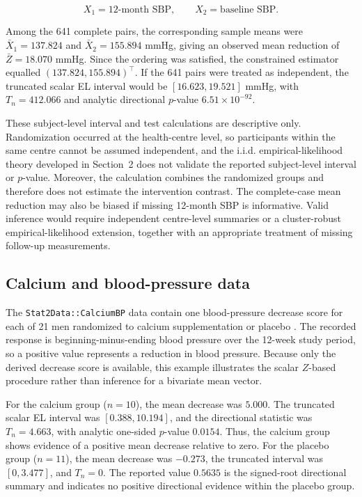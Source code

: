 \documentclass[11pt]{article}
\theoremstyle{remark}
\begin{document}
$$
X_1=\text{12-month SBP},
\qquad
X_2=\text{baseline SBP}.
$$

Among the 641 complete pairs, the corresponding sample means were $\bar X_1=137.824$ and $\bar X_2=155.894$ mmHg, giving an observed mean reduction of $\bar Z=18.070$ mmHg. Since the ordering was satisfied, the constrained estimator equalled $(137.824,155.894)^\top$. If the 641 pairs were treated as independent, the truncated scalar EL interval would be $[16.623,19.521]$ mmHg, with $T_n=412.066$ and analytic directional $p$-value $6.51\times10^{-92}$.

These subject-level interval and test calculations are descriptive only. Randomization occurred at the health-centre level, so participants within the same centre cannot be assumed independent, and the i.i.d. empirical-likelihood theory developed in Section~2 does not validate the reported subject-level interval or $p$-value. Moreover, the calculation combines the randomized groups and therefore does not estimate the intervention contrast. The complete-case mean reduction may also be biased if missing 12-month SBP is informative. Valid inference would require independent centre-level summaries or a cluster-robust empirical-likelihood extension, together with an appropriate treatment of missing follow-up measurements.

\subsection{Calcium and blood-pressure data}

The \texttt{Stat2Data::CalciumBP} data contain one blood-pressure decrease score for each of 21 men randomized to calcium supplementation or placebo \citet{lyle1987blood}. The recorded response is beginning-minus-ending blood pressure over the 12-week study period, so a positive value represents a reduction in blood pressure. Because only the derived decrease score is available, this example illustrates the scalar $Z$-based procedure rather than inference for a bivariate mean vector.

For the calcium group ($n=10$), the mean decrease was $5.000$. The truncated scalar EL interval was $[0.388,10.194]$, and the directional statistic was $T_n=4.663$, with analytic one-sided $p$-value $0.0154$. Thus, the calcium group shows evidence of a positive mean decrease relative to zero. For the placebo group ($n=11$), the mean decrease was $-0.273$, the truncated interval was $[0,3.477]$, and $T_n=0$. The reported value $0.5635$ is the signed-root directional summary and indicates no positive directional evidence within the placebo group.
\end{document}
